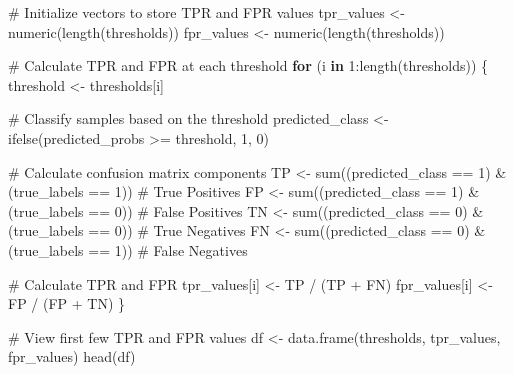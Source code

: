 \documentclass[
  letterpaper,
  DIV=11,
  numbers=noendperiod]{scrreprt}
\newenvironment{Shaded}{\begin{snugshade}}{\end{snugshade}}
\newcommand{\CommentTok}[1]{\textcolor[rgb]{0.37,0.37,0.37}{#1}}
\newcommand{\ControlFlowTok}[1]{\textcolor[rgb]{0.00,0.23,0.31}{\textbf{#1}}}
\newcommand{\DecValTok}[1]{\textcolor[rgb]{0.68,0.00,0.00}{#1}}
\newcommand{\FunctionTok}[1]{\textcolor[rgb]{0.28,0.35,0.67}{#1}}
\newcommand{\NormalTok}[1]{\textcolor[rgb]{0.00,0.23,0.31}{#1}}
\newcommand{\OtherTok}[1]{\textcolor[rgb]{0.00,0.23,0.31}{#1}}
\newcommand{\SpecialCharTok}[1]{\textcolor[rgb]{0.37,0.37,0.37}{#1}}
\begin{document}
\begin{Shaded}
\begin{Highlighting}[]
\CommentTok{\# Initialize vectors to store TPR and FPR values}
\NormalTok{tpr\_values }\OtherTok{\textless{}{-}} \FunctionTok{numeric}\NormalTok{(}\FunctionTok{length}\NormalTok{(thresholds))}
\NormalTok{fpr\_values }\OtherTok{\textless{}{-}} \FunctionTok{numeric}\NormalTok{(}\FunctionTok{length}\NormalTok{(thresholds))}

\CommentTok{\# Calculate TPR and FPR at each threshold}
\ControlFlowTok{for}\NormalTok{ (i }\ControlFlowTok{in} \DecValTok{1}\SpecialCharTok{:}\FunctionTok{length}\NormalTok{(thresholds)) \{}
\NormalTok{  threshold }\OtherTok{\textless{}{-}}\NormalTok{ thresholds[i]}
  
  \CommentTok{\# Classify samples based on the threshold}
\NormalTok{  predicted\_class }\OtherTok{\textless{}{-}} \FunctionTok{ifelse}\NormalTok{(predicted\_probs }\SpecialCharTok{\textgreater{}=}\NormalTok{ threshold, }\DecValTok{1}\NormalTok{, }\DecValTok{0}\NormalTok{)}
  
  \CommentTok{\# Calculate confusion matrix components}
\NormalTok{  TP }\OtherTok{\textless{}{-}} \FunctionTok{sum}\NormalTok{((predicted\_class }\SpecialCharTok{==} \DecValTok{1}\NormalTok{) }\SpecialCharTok{\&}\NormalTok{ (true\_labels }\SpecialCharTok{==} \DecValTok{1}\NormalTok{))  }\CommentTok{\# True Positives}
\NormalTok{  FP }\OtherTok{\textless{}{-}} \FunctionTok{sum}\NormalTok{((predicted\_class }\SpecialCharTok{==} \DecValTok{1}\NormalTok{) }\SpecialCharTok{\&}\NormalTok{ (true\_labels }\SpecialCharTok{==} \DecValTok{0}\NormalTok{))  }\CommentTok{\# False Positives}
\NormalTok{  TN }\OtherTok{\textless{}{-}} \FunctionTok{sum}\NormalTok{((predicted\_class }\SpecialCharTok{==} \DecValTok{0}\NormalTok{) }\SpecialCharTok{\&}\NormalTok{ (true\_labels }\SpecialCharTok{==} \DecValTok{0}\NormalTok{))  }\CommentTok{\# True Negatives}
\NormalTok{  FN }\OtherTok{\textless{}{-}} \FunctionTok{sum}\NormalTok{((predicted\_class }\SpecialCharTok{==} \DecValTok{0}\NormalTok{) }\SpecialCharTok{\&}\NormalTok{ (true\_labels }\SpecialCharTok{==} \DecValTok{1}\NormalTok{))  }\CommentTok{\# False Negatives}
  
  \CommentTok{\# Calculate TPR and FPR}
\NormalTok{  tpr\_values[i] }\OtherTok{\textless{}{-}}\NormalTok{ TP }\SpecialCharTok{/}\NormalTok{ (TP }\SpecialCharTok{+}\NormalTok{ FN)}
\NormalTok{  fpr\_values[i] }\OtherTok{\textless{}{-}}\NormalTok{ FP }\SpecialCharTok{/}\NormalTok{ (FP }\SpecialCharTok{+}\NormalTok{ TN)}
\NormalTok{\}}

\CommentTok{\# View first few TPR and FPR values}
\NormalTok{df }\OtherTok{\textless{}{-}} \FunctionTok{data.frame}\NormalTok{(thresholds, tpr\_values, fpr\_values)}
\FunctionTok{head}\NormalTok{(df)}
\end{Highlighting}
\end{Shaded}
\end{document}
